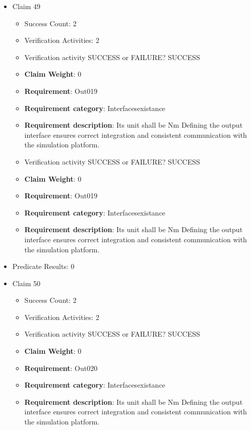 \documentclass{article}
\begin{document}
\begin{itemize}
  				  \item Claim 49
				\begin{itemize}
			    	\item Success Count: 2 
			    	\item Verification Activities: 2
					\item Verification activity SUCCESS or FAILURE? SUCCESS
					\item \textbf{Claim Weight}: 0
						\item \textbf{Requirement}: Out019 
						\item \textbf{Requirement category}: Interfacesexistance 
						\item \textbf{Requirement description}: Its unit shall be Nm Defining the output interface ensures correct integration and consistent communication with the simulation platform.
					
					\item Verification activity SUCCESS or FAILURE? SUCCESS
					\item \textbf{Claim Weight}: 0
						\item \textbf{Requirement}: Out019 
						\item \textbf{Requirement category}: Interfacesexistance 
						\item \textbf{Requirement description}: Its unit shall be Nm Defining the output interface ensures correct integration and consistent communication with the simulation platform.
					
				\end{itemize}
				
									    
				\item Predicate Results: 0

  				  \item Claim 50
				\begin{itemize}
			    	\item Success Count: 2 
			    	\item Verification Activities: 2
					\item Verification activity SUCCESS or FAILURE? SUCCESS
					\item \textbf{Claim Weight}: 0
						\item \textbf{Requirement}: Out020 
						\item \textbf{Requirement category}: Interfacesexistance 
						\item \textbf{Requirement description}: Its unit shall be Nm Defining the output interface ensures correct integration and consistent communication with the simulation platform.
					

\end{itemize}
\end{itemize}
\end{document}
